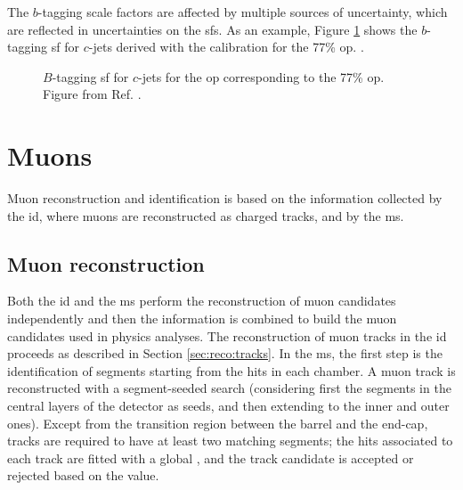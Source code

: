 The $b$-tagging scale factors are affected by multiple sources of uncertainty, which are reflected in uncertainties on the \glspl{sf}.
As an example, Figure \ref{fig:obj:btagSF} shows the $b$-tagging \gls{sf} for $c$-jets derived with the \ttbar calibration for the
77\% \gls{op}. .

\begin{figure}[h]
\begin{center}
\end{center}
 \caption{$B$-tagging \gls{sf} for $c$-jets for the \gls{op} corresponding to the 77\% \gls{op}. Figure from Ref. \cite{ATLAS:2018bpl}.}
  \label{fig:obj:btagSF}
\end{figure}


\section{Muons}

Muon reconstruction and identification \cite{Aad:2016jkr} is based on the information collected by the \gls{id}, where muons are reconstructed as charged tracks, and by the \gls{ms}. 

\subsection{Muon reconstruction}

Both the \gls{id} and the \gls{ms} perform the reconstruction
of muon candidates independently and then the information is combined to build the muon candidates used in physics analyses. 
The reconstruction of muon tracks in the \gls{id} proceeds as described in Section \ref{sec:reco:tracks}. In the \gls{ms}, the first step is the identification of segments starting from the hits in each chamber. A muon track is reconstructed with a segment-seeded search (considering first the segments in the central layers of the detector as seeds, and then extending to the inner and outer ones). Except from the transition region between the barrel and the end-cap, tracks are required to have at least two matching segments; the hits associated to each track are fitted with a global \chis, and the track candidate is accepted or rejected based on the \chis value. 

